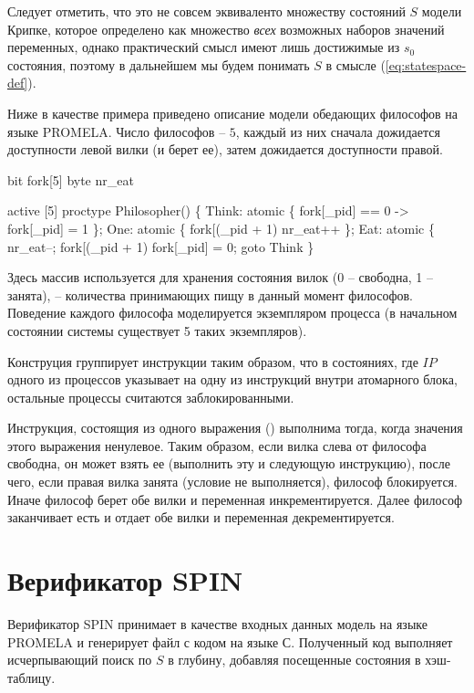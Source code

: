 Следует отметить, что это не совсем эквиваленто множеству состояний $S$ модели Крипке, которое
определено как множество \emph{всех} возможных наборов значений переменных, однако
практический смысл имеют лишь достижимые из $s_0$ состояния, поэтому в дальнейшем мы будем
понимать $S$ в смысле (\ref{eq:statespace-def}).

Ниже в качестве примера приведено описание модели обедающих философов на языке
PROMELA. Число философов -- $5$, каждый из них сначала дожидается доступности левой вилки
(и берет ее), затем дожидается доступности правой.

\label{code:philo}

\begin{CodeBlock}
bit  fork[5]
byte nr_eat

active [5] proctype Philosopher() \{
Think:
  atomic \{ fork[_pid] == 0 -> fork[_pid] = 1 \};
One:
  atomic \{ fork[(_pid + 1)%
           nr_eat++ \};
Eat:
  atomic \{ nr_eat--; fork[(_pid + 1)%
  fork[_pid] = 0;
  goto Think
\}  
\end{CodeBlock}

Здесь массив  используется для хранения состояния вилок (0 -- свободна, 1 --
занята),  -- количества принимающих пищу в данный момент философов. Поведение
каждого философа моделируется экземпляром процесса  (в начальном
состоянии системы существует 5 таких экземпляров).

Конструция  группирует инструкции таким образом, что в состояниях, где $IP$
одного из процессов указывает на одну из инструкций внутри атомарного блока, остальные
процессы считаются заблокированными.

Инструкция, состоящия из одного выражения () выполнима тогда, когда
значения этого выражения ненулевое. Таким образом, если вилка слева от философа свободна,
он может взять ее (выполнить эту и следующую инструкцию), после чего, если правая вилка
занята (условие  не выполняется), философ
блокируется. Иначе философ берет обе вилки и переменная 
инкрементируется. Далее философ заканчивает есть и отдает обе вилки и переменная
 декрементируется.

\section{Верификатор SPIN}
\label{sec:spin}

Верификатор SPIN принимает в качестве входных данных модель на языке PROMELA и генерирует
файл с кодом на языке С. Полученный код выполняет исчерпывающий поиск по $S$ в глубину,
добавляя посещенные состояния в хэш-таблицу.

